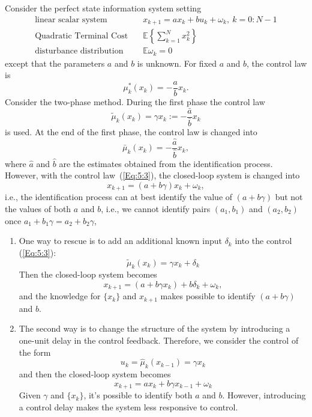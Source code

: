 \begin{example}
Consider the perfect state information system setting
\begin{align*}
\text{linear scalar system}\quad&x_{k+1}=ax_k+bu_k+\omega_k,\ k=0:N-1\\
\text{Quadratic Terminal Cost}\quad&\mathbb{E}\left\{\sum_{k=1}^Nx_k^2\right\}\\
\text{disturbance distribution}\quad&\mathbb{E}\omega_k=0
\end{align*}
except that the parameters $a$ and $b$ is unknown. For fixed $a$ and $b$, the control law is
\[
\mu_k^*(x_k)=-\frac{a}{b}x_k.
\]
Consider the two-phase method. 
During the first phase the control law 
\begin{equation}\label{Eq:5:3}
\tilde{\mu}_k(x_k)=\gamma x_k:=-\frac{\bar{a}}{\bar{b}}x_k
\end{equation}
is used.
At the end of the first phase, the control law is changed into
\begin{equation}
\bar{\mu}_k(x_k)=-\frac{\hat a}{\hat b}x_k,
\end{equation}
where $\hat a$ and $\hat b$ are the estimates obtained from the identification process.
However, with the control law~(\ref{Eq:5:3}), the closed-loop system is changed into
\[
x_{k+1}=(a+b\gamma)x_k+\omega_k,
\]
i.e., the identification process can at best identify the value of $(a+b\gamma)$ but not the values of both $a$ and $b$, i.e., we cannot identify pairs $(a_1,b_1)$ and $(a_2,b_2)$ once $a_1+b_1\gamma=a_2+b_2\gamma$,
\begin{enumerate}
\item
One way to rescue is to add an additional known input $\delta_k$ into the control (\ref{Eq:5:3}):
\[
\tilde{\mu}_k(x_k)=\gamma x_k+\delta_k
\]
Then the closed-loop system becomes 
\[
x_{k+1} = (a+b\gamma x_k)+b\delta_k+\omega_k,
\]
and the knowledge for $\{x_k\}$ and $x_{k+1}$ makes possible to identify $(a+b\gamma)$ and $b$.
\item
The second way is to change the structure of the system by introducing a one-unit delay in the control feedback.
Therefore, we consider the control of the form
\[
u_k = \hat{\mu}_k(x_{k-1})=\gamma x_k
\]
and then the closed-loop system becomes 
\[
x_{k+1} =ax_k+b\gamma x_{k-1}+\omega_k
\]
Given $\gamma$ and $\{x_k\}$, it's possible to identify both $a$ and $b$.
However, introducing a control delay makes the system less responsive to control.
\end{enumerate}
\end{example}



